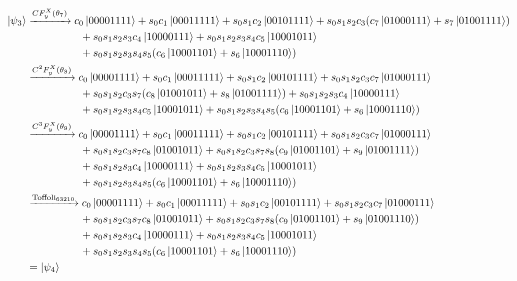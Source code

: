 \documentclass[11pt, oneside]{article}   	%
\begin{document}
\begin{align*}
\ket{\psi_3}
&\xrightarrow{CF^X_y(\theta_7)} 
c_0 \ket{00001111} 
+ s_0 c_1 \ket{00011111}
+ s_0 s_1 c_2 \ket{00101111} 
+ s_0 s_1 s_2 c_3 (c_7 \ket{01000111} + s_7 \ket{01001111}) \\
& \hspace{5em} 
+ s_0 s_1 s_2 s_3 c_4 \ket{10000111}
+ s_0 s_1 s_2 s_3 s_4 c_5 \ket{10001011} \\
& \hspace{5em} 
+ s_0 s_1 s_2 s_3 s_4 s_5 (c_6 \ket{10001101} + s_6 \ket{10001110} ) \\
&\xrightarrow{C^2 F^X_y(\theta_8)} 
c_0 \ket{00001111} 
+ s_0 c_1 \ket{00011111}
+ s_0 s_1 c_2 \ket{00101111} 
+ s_0 s_1 s_2 c_3 c_7 \ket{01000111} \\
& \hspace{5em} 
+ s_0 s_1 s_2 c_3 s_7 (c_8 \ket{01001011} + s_8 \ket{01001111}) 
+ s_0 s_1 s_2 s_3 c_4 \ket{10000111} \\
& \hspace{5em} 
+ s_0 s_1 s_2 s_3 s_4 c_5 \ket{10001011}
+ s_0 s_1 s_2 s_3 s_4 s_5 (c_6 \ket{10001101} + s_6 \ket{10001110} ) \\
&\xrightarrow{C^3 F^X_y(\theta_9)} 
c_0 \ket{00001111} 
+ s_0 c_1 \ket{00011111}
+ s_0 s_1 c_2 \ket{00101111} 
+ s_0 s_1 s_2 c_3 c_7 \ket{01000111} \\
& \hspace{5em} 
+ s_0 s_1 s_2 c_3 s_7 c_8 \ket{01001011}
+ s_0 s_1 s_2 c_3 s_7 s_8 (c_9 \ket{01001101} + s_9 \ket{01001111}) \\
& \hspace{5em} 
+ s_0 s_1 s_2 s_3 c_4 \ket{10000111}
+ s_0 s_1 s_2 s_3 s_4 c_5 \ket{10001011} \\
& \hspace{5em} 
+ s_0 s_1 s_2 s_3 s_4 s_5 (c_6 \ket{10001101} + s_6 \ket{10001110} ) \\
&\xrightarrow{\text{Toffoli}_{63210}} 
c_0 \ket{00001111} 
+ s_0 c_1 \ket{00011111}
+ s_0 s_1 c_2 \ket{00101111} 
+ s_0 s_1 s_2 c_3 c_7 \ket{01000111} \\
& \hspace{5em} 
+ s_0 s_1 s_2 c_3 s_7 c_8 \ket{01001011}
+ s_0 s_1 s_2 c_3 s_7 s_8 (c_9 \ket{01001101} + s_9 \ket{01001110}) \\
& \hspace{5em} 
+ s_0 s_1 s_2 s_3 c_4 \ket{10000111}
+ s_0 s_1 s_2 s_3 s_4 c_5 \ket{10001011} \\
& \hspace{5em} 
+ s_0 s_1 s_2 s_3 s_4 s_5 (c_6 \ket{10001101} + s_6 \ket{10001110} ) \\
& = \ket{\psi_4} 
\end{align*}
\end{document}
